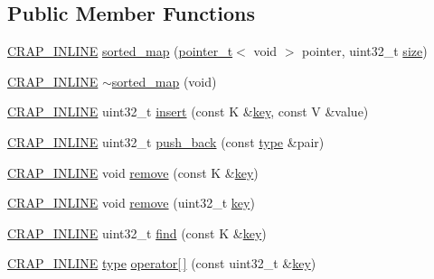 \subsection*{Public Member Functions}
\begin{DoxyCompactItemize}
\item 
\hyperlink{config__x86_8h_a5a40526b8d842e7ff731509998bb0f1c}{C\+R\+A\+P\+\_\+\+I\+N\+L\+I\+N\+E} \hyperlink{classcrap_1_1sorted__map_ac25eb5a40521f93bfcd220809eba2c61}{sorted\+\_\+map} (\hyperlink{structcrap_1_1pointer__t}{pointer\+\_\+t}$<$ void $>$ pointer, uint32\+\_\+t \hyperlink{classcrap_1_1sorted__map_a6412f21fcbf09533705a9a8335f71706}{size})
\item 
\hyperlink{config__x86_8h_a5a40526b8d842e7ff731509998bb0f1c}{C\+R\+A\+P\+\_\+\+I\+N\+L\+I\+N\+E} \hyperlink{classcrap_1_1sorted__map_a4c21228be7cfa260d255beb08e8aab52}{$\sim$sorted\+\_\+map} (void)
\item 
\hyperlink{config__x86_8h_a5a40526b8d842e7ff731509998bb0f1c}{C\+R\+A\+P\+\_\+\+I\+N\+L\+I\+N\+E} uint32\+\_\+t \hyperlink{classcrap_1_1sorted__map_ab1f24127b6d5c6b2992440bd33a24fcd}{insert} (const K \&\hyperlink{classcrap_1_1sorted__map_a7b1a41d7af597537a793fb19e307716d}{key}, const V \&value)
\item 
\hyperlink{config__x86_8h_a5a40526b8d842e7ff731509998bb0f1c}{C\+R\+A\+P\+\_\+\+I\+N\+L\+I\+N\+E} uint32\+\_\+t \hyperlink{classcrap_1_1sorted__map_a5b023aff9ef7823601f02a1d94933f00}{push\+\_\+back} (const \hyperlink{classcrap_1_1sorted__map_a53d3509992e52b87de809a99bf246551}{type} \&pair)
\item 
\hyperlink{config__x86_8h_a5a40526b8d842e7ff731509998bb0f1c}{C\+R\+A\+P\+\_\+\+I\+N\+L\+I\+N\+E} void \hyperlink{classcrap_1_1sorted__map_a019ec7fee361312dc2eeb8827ce86f9b}{remove} (const K \&\hyperlink{classcrap_1_1sorted__map_a7b1a41d7af597537a793fb19e307716d}{key})
\item 
\hyperlink{config__x86_8h_a5a40526b8d842e7ff731509998bb0f1c}{C\+R\+A\+P\+\_\+\+I\+N\+L\+I\+N\+E} void \hyperlink{classcrap_1_1sorted__map_a01fd5f7e24eb1d6f22695a4d546a1514}{remove} (uint32\+\_\+t \hyperlink{classcrap_1_1sorted__map_a7b1a41d7af597537a793fb19e307716d}{key})
\item 
\hyperlink{config__x86_8h_a5a40526b8d842e7ff731509998bb0f1c}{C\+R\+A\+P\+\_\+\+I\+N\+L\+I\+N\+E} uint32\+\_\+t \hyperlink{classcrap_1_1sorted__map_ad0950e6fa511d56a0dff658acab8ef90}{find} (const K \&\hyperlink{classcrap_1_1sorted__map_a7b1a41d7af597537a793fb19e307716d}{key})
\item 
\hyperlink{config__x86_8h_a5a40526b8d842e7ff731509998bb0f1c}{C\+R\+A\+P\+\_\+\+I\+N\+L\+I\+N\+E} \hyperlink{classcrap_1_1sorted__map_a53d3509992e52b87de809a99bf246551}{type} \hyperlink{classcrap_1_1sorted__map_a7db159f0493e262bb333f81ef789339b}{operator\mbox{[}$\,$\mbox{]}} (const uint32\+\_\+t \&\hyperlink{classcrap_1_1sorted__map_a7b1a41d7af597537a793fb19e307716d}{key})

\end{DoxyCompactItemize}
